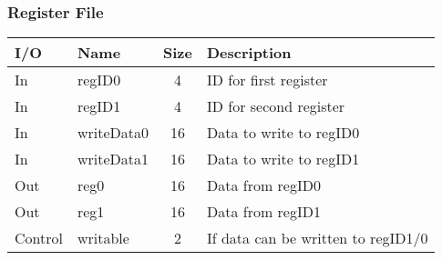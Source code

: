 \documentclass{article}
\begin{document}
		\subsubsection{Register File}
			\begin{center} \begin{tabular}{| l | l | c | l |} \hline 
				I/O & Name       & Size & Description \\ \hline 
				In  & regID0     & 4    & ID for first register \\ \hline
				In  & regID1     & 4    & ID for second register \\ \hline
				In  & writeData0 & 16   & Data to write to regID0 \\ \hline
				In  & writeData1 & 16   & Data to write to regID1 \\ \hline
				Out & reg0       & 16   & Data from regID0 \\ \hline
				Out & reg1       & 16   & Data from regID1 \\ \hline
				Control & writable   & 2    & If data can be written to regID1/0\\ \hline
			\end{tabular} \end{center}
\end{document}
